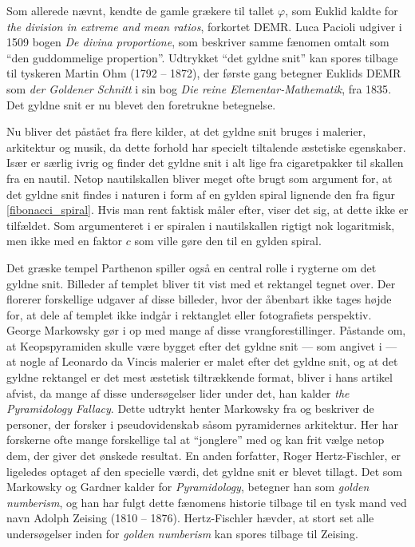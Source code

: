 {
Som allerede nævnt, kendte de gamle grækere til tallet $\varphi$, som
Euklid kaldte for \emph{the division in extreme and mean ratios},
forkortet DEMR. Luca Pacioli udgiver i 1509 bogen \emph{De divina
proportione}, som beskriver samme fænomen omtalt som ``den guddommelige
propertion''. Udtrykket ``det gyldne snit'' kan spores tilbage til
tyskeren Martin Ohm (1792 -- 1872), der første gang betegner Euklids DEMR
som \emph{der Goldener Schnitt} i sin bog \emph{Die reine
Elementar-Mathematik}, fra 1835\cite{Markowsky1992}. Det gyldne snit er
nu blevet den foretrukne betegnelse.

Nu bliver det påstået fra flere kilder, at det gyldne snit bruges i
malerier, arkitektur og musik, da dette forhold har specielt tiltalende
æstetiske
egenskaber\cite{GoldenNumber}\cite{RatioArt}\cite{Putz1995}\cite{Stakhov2006490}\cite{Boussora2004}.
Især \cite{GoldenNumber} er særlig ivrig og finder det gyldne snit i alt
lige fra cigaretpakker til skallen fra en nautil. Netop nautilskallen
bliver meget ofte brugt som argument for, at det gyldne snit findes i
naturen i form af en gylden spiral lignende den fra figur
\ref{fibonacci_spiral}. Hvis man rent faktisk måler efter,
viser det sig, at dette ikke er tilfældet. Som argumenteret i
\cite{Sharp2002} er spiralen i nautilskallen rigtigt nok logaritmisk,
men ikke med en faktor $c$ som ville gøre den til en gylden spiral.

Det græske tempel Parthenon spiller også en central rolle i rygterne om
det gyldne snit. Billeder af templet bliver tit vist med et rektangel
tegnet over. Der florerer forskellige udgaver af disse billeder, hvor
der åbenbart ikke tages højde for, at dele af templet ikke indgår i
rektanglet eller fotografiets perspektiv. George Markowsky gør i
\cite{Markowsky1992} op med mange af disse vrangforestillinger. Påstande
om, at Keopspyramiden skulle være bygget efter det gyldne snit --- som
angivet i \cite{Stakhov2006490} --- at nogle af Leonardo da Vincis malerier
er malet efter det gyldne snit, og at det gyldne rektangel er det mest
æstetisk tiltrækkende format\cite{GoldenNumber}\cite{RatioArt}, bliver i
hans artikel afvist, da mange af disse undersøgelser lider under det, han
kalder \emph{the Pyramidology Fallacy}. Dette udtrykt henter Markowsky
fra \cite{Gardner1952_2} og beskriver de personer, der forsker i
pseudovidenskab såsom pyramidernes arkitektur. Her har forskerne ofte
mange forskellige tal at ``jonglere'' med og kan frit vælge netop dem,
der giver det ønskede resultat. En anden forfatter, Roger
Hertz-Fischler, er ligeledes optaget af den specielle værdi, det gyldne
snit er blevet tillagt. Det som Markowsky og Gardner kalder for
\emph{Pyramidology}, betegner han som \emph{golden numberism}, og han har
fulgt dette fænomens historie tilbage til en tysk mand ved navn
Adolph Zeising (1810 -- 1876)\cite{Herz-Fischler2005}. Hertz-Fischler
hævder, at stort set alle undersøgelser inden for \emph{golden numberism}
kan spores tilbage til Zeising.

}
